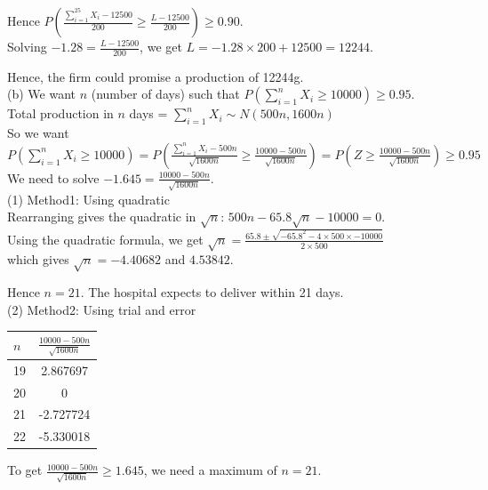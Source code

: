 \documentclass[bigtut]{tutorial}\usepackage[]{graphicx}\usepackage[]{color}
\begin{document}
\begin{tutorial}
\begin{questions}
\begin{solution}
Hence $P(\frac{ \sum_{i=1}^{25} X_{i} - 12500}{200} \geq \frac{L-12500}{200}) \geq 0.90$. \\

\vspace{.5cm}
Solving $-1.28 = \frac{L-12500}{200}$, we get
$L = -1.28 \times 200 + 12500 = 12244$.

Hence, the firm could promise a production of 12244g. \\


(b)
We want $n$ (number of days) such that $P(\sum_{i=1}^{n} X_{i} \geq 10000) \geq 0.95$.  \\

Total production in $n$ days = $\sum_{i=1}^{n} X_{i} \sim N(500n,1600n)$ \\

So we want $P(\sum_{i=1}^{n} X_{i} \geq 10000)
= P(\frac{ \sum_{i=1}^{n} X_{i} - 500n}{\sqrt{1600n}} \geq \frac{ 10000-500n}{\sqrt{1600n}} )
 = P(Z \geq \frac{ 10000 -500n}{\sqrt{1600n}} )
\geq 0.95$ \\

\vspace{.5cm}
We need to solve $-1.645 = \frac{ 10000 -500n}{\sqrt{1600n}}$. \\

(1) Method1: Using quadratic \\
Rearranging gives the quadratic in $\sqrt{n}$: $500n -65.8 \sqrt{n} - 10000 = 0$. \\

Using the quadratic formula, we get
$\sqrt{n} = \frac{ 65.8 \pm \sqrt{-65.8^2- 4 \times 500 \times -10000}}{2 \times 500}$ \\
which gives $\sqrt{n} = -4.40682$ and $4.53842$.

Hence $n= 21$. The hospital expects to deliver within 21 days. \\

(2) Method2: Using trial and error \\

\begin{tabular}{|l|c|} \hline
$n$ & $\frac{10000 -500n}{\sqrt{1600n}}$ \\ \hline
19 &  2.867697 \\
20 & 0 \\
21 & -2.727724 \\ 
22 & -5.330018 \\ \hline
\end{tabular}

\vspace{.2cm}
To get $\frac{10000 -500n}{\sqrt{1600n}} \geq 1.645$, we need a maximum of $n =21$. \\




\end{solution}
\end{questions}
\end{tutorial}
\end{document}
